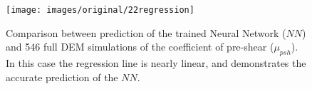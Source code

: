 \begin{figure}[!h] 
\centering 
\texttt{[image: images/original/22regression]}
\caption[Comparison between prediction of the trained NN and full DEM
simulation]{Comparison between prediction of the trained Neural Network ($NN$)
and 546 full DEM simulations of the coefficient of pre-shear ($\mu_{psh}$). In
this case the regression line is nearly linear, and demonstrates the accurate
prediction of the $NN$.}
\label{fig:22regression} 
\end{figure}

